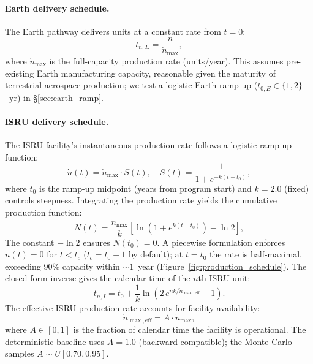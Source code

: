 \documentclass[preprint,12pt]{elsarticle}
\begin{document}
\paragraph{Earth delivery schedule.} The Earth pathway delivers units at a constant rate from $t = 0$:
\begin{equation}
  t_{n,E} = \frac{n}{\dot{n}_{\max}},
  \label{eq:earth_schedule}
\end{equation}
where $\dot{n}_{\max}$ is the full-capacity production rate (units/year). This assumes pre-existing Earth manufacturing capacity, reasonable given the maturity of terrestrial aerospace production; we test a logistic Earth ramp-up ($t_{0,E} \in \{1, 2\}$~yr) in \S\ref{sec:earth_ramp}.

\paragraph{ISRU delivery schedule.} The ISRU facility's instantaneous production rate follows a logistic ramp-up function:
\begin{equation}
  \dot{n}(t) = \dot{n}_{\max} \cdot S(t), \quad S(t) = \frac{1}{1 + e^{-k(t - t_0)}},
  \label{eq:scurve}
\end{equation}
where $t_0$ is the ramp-up midpoint (years from program start) and $k = 2.0$ (fixed) controls steepness. Integrating the production rate yields the cumulative production function:
\begin{equation}
  N(t) = \frac{\dot{n}_{\max}}{k} \left[ \ln\!\left(1 + e^{k(t - t_0)}\right) - \ln 2 \right],
  \label{eq:cumulative_production}
\end{equation}
The constant $-\ln 2$ ensures $N(t_0) = 0$. A piecewise formulation enforces $\dot{n}(t) = 0$ for $t < t_c$ ($t_c = t_0 - 1$ by default); at $t = t_0$ the rate is half-maximal, exceeding 90\% capacity within ${\sim}1$~year (Figure~\ref{fig:production_schedule}). The closed-form inverse gives the calendar time of the $n$th ISRU unit:
\begin{equation}
  t_{n,I} = t_0 + \frac{1}{k} \ln\!\left(2\,e^{nk/\dot{n}_{\max,\mathrm{eff}}} - 1\right).
  \label{eq:production_schedule}
\end{equation}
The effective ISRU production rate accounts for facility availability:
\begin{equation}
  \dot{n}_{\max,\mathrm{eff}} = A \cdot \dot{n}_{\max},
  \label{eq:availability}
\end{equation}
where $A \in [0,1]$ is the fraction of calendar time the facility is operational. The deterministic baseline uses $A = 1.0$ (backward-compatible); the Monte Carlo samples $A \sim U[0.70, 0.95]$.
\end{document}
